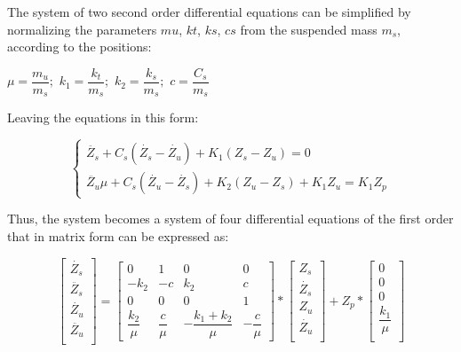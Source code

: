 \documentclass[tesi]{subfiles}
\begin{document}
\noindent The system of two second order differential equations can be simplified by normalizing the parameters $mu$, $kt$, $ks$, $cs$ from the suspended mass $m_{s}$, according to the positions\cite{gillespie1992everything}:

        \begin{center}
       		$\mu = \dfrac{m_{u}}{m_{s}}; $ \quad
        	$k_{1} = \dfrac{k_{t}}{m_{s}} ; $ \quad
        	$k_{2} = \dfrac{k_{s}}{m_{s}} ; $ \quad
       		$c = \dfrac{C_{s}}{m_{s}}$
		\end{center}

\noindent Leaving the equations in this form:

\begin{center}

\[
    \left\{
                \begin{array}{ll}
                  \ddot{Z_{s}} + C_{s} ( \dot{Z_{s}} - \dot{Z_{u}} ) + K_{1} (Z_{s} - Z_{u}) = 0\\
                  \ddot{Z_{u}} \mu + C_{s} ( \dot{Z_{u}} - \dot{Z_{s}}) + K_{2} (Z_{u} - Z_{s}) + K_{1}Z_{u}  = K_{1}Z_{p}
                \end{array}
              \right.
\]




\end{center}
\noindent Thus, the system becomes a system of four differential equations of the first order that in matrix form can be expressed as:
\begin{center}
\[
\begin{bmatrix}
    \dot{Z_{s}}\\
    \ddot{Z_{s}} \\
    \dot{Z_{u}}\\
    \ddot{Z_{u}} \\
\end{bmatrix}
=
\begin{bmatrix}
    0 & 1 & 0 & 0 \\
    -k_{2} & -c & k_{2} & c \\
    0 & 0 & 0 & 1 \\
    \dfrac{k_{2}}{\mu} & \dfrac{c}{\mu} & -\dfrac{k_{1} + k_{2}}{\mu} & -\dfrac{c}{\mu} 
\end{bmatrix}
*
\begin{bmatrix}
    Z_{s}\\
    \dot{Z_{s}} \\
    Z_{u}\\
    \dot{Z_{u}} \\
\end{bmatrix}
+Z_{p}*
\begin{bmatrix}
    0\\
    0\\
    0\\
    \dfrac{k_{1}}{\mu} \\
\end{bmatrix}
\]
\end{center}
\end{document}
